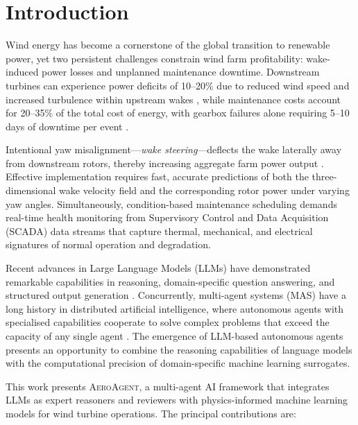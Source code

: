 \documentclass[12pt]{article}
\begin{document}
\section{Introduction}
\label{sec:introduction}

Wind energy has become a cornerstone of the global transition to renewable power, yet two persistent challenges constrain wind farm profitability: wake-induced power losses and unplanned maintenance downtime.
Downstream turbines can experience power deficits of 10--20\% due to reduced wind speed and increased turbulence within upstream wakes \citep{Barthelmie2009, PorteAgel2020}, while maintenance costs account for 20--35\% of the total cost of energy, with gearbox failures alone requiring 5--10 days of downtime per event \citep{tchakoua2014, sheng2013}.

Intentional yaw misalignment---\emph{wake steering}---deflects the wake laterally away from downstream rotors, thereby increasing aggregate farm power output \citep{Fleming2017, Gebraad2016}.
Effective implementation requires fast, accurate predictions of both the three-dimensional wake velocity field and the corresponding rotor power under varying yaw angles.
Simultaneously, condition-based maintenance scheduling demands real-time health monitoring from Supervisory Control and Data Acquisition (SCADA) data streams that capture thermal, mechanical, and electrical signatures of normal operation and degradation.

Recent advances in Large Language Models (LLMs) have demonstrated remarkable capabilities in reasoning, domain-specific question answering, and structured output generation \citep{Brown2020}.
Concurrently, multi-agent systems (MAS) have a long history in distributed artificial intelligence, where autonomous agents with specialised capabilities cooperate to solve complex problems that exceed the capacity of any single agent \citep{Wooldridge2009, Dorri2018}.
The emergence of LLM-based autonomous agents \citep{Xi2023, Wang2024} presents an opportunity to combine the reasoning capabilities of language models with the computational precision of domain-specific machine learning surrogates.

This work presents \textsc{AeroAgent}, a multi-agent AI framework that integrates LLMs as expert reasoners and reviewers with physics-informed machine learning models for wind turbine operations.
The principal contributions are:
\end{document}
